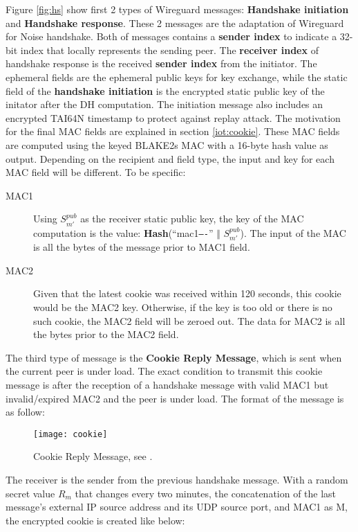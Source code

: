     Figure \ref{fig:hs} show first 2 types of Wireguard messages: \textbf{Handshake initiation} and
    \textbf{Handshake response}. These 2 messages are the adaptation of Wireguard for Noise
    handshake. Both of messages contains a \textbf{sender index} to indicate a 32-bit index
    that locally represents the sending peer. The \textbf{receiver index} of handshake response
    is the received \textbf{sender index} from the initiator. The ephemeral fields are the
    ephemeral public keys for key exchange, while the static field of the \textbf{handshake initiation}
    is the encrypted static public key of the initator after the DH computation. The initiation message
    also includes an encrypted TAI64N \cite{tai64} timestamp to protect against replay attack. The motivation
    for the final MAC fields are explained in section \ref{iot:cookie}. These MAC fields are computed
    using the keyed BLAKE2s MAC with a 16-byte hash value as output. Depending on the recipient and
    field type, the input and key for each MAC field will be different. To be specific:
      \begin{description}
        \item[MAC1] Using $S^{pub}_{m'}$ as the receiver static public key, the key of the MAC computation
        is the value: \textbf{Hash}(``mac1\texttt{----}'' $\Vert$ $S^{pub}_{m'}$). The input of the MAC is all
        the bytes of the message prior to MAC1 field.
        \item[MAC2] Given that the latest cookie was received within 120 seconds, this cookie
        would be the MAC2 key. Otherwise, if the key is too old or there is no such cookie, the MAC2 
        field will be zeroed out. The data for MAC2 is all the bytes prior to the MAC2 field.
      \end{description}
    
   The third type of message is the \textbf{Cookie Reply Message}, which is sent when the current
   peer is under load. The exact condition to transmit this cookie message is after the reception
   of a handshake message with valid MAC1 but invalid/expired  MAC2 and the peer is under load.
   The format of the message is as follow:

    \begin{figure}[h]
      \centering
      \texttt{[image: cookie]}
      \caption{Cookie Reply Message, see \cite[p.~13]{wireguard}.}
      \label{fig:cookie}
    \end{figure} 

    The receiver is the sender from the previous handshake message. With a random secret value $R_m$ that changes
    every two minutes, the concatenation of the last message's external IP source address and its 
    UDP source port, and MAC1 as M, the encrypted cookie is created like below:

